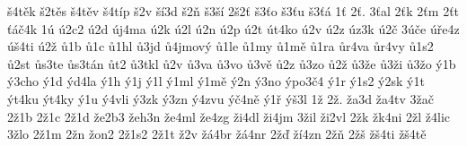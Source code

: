 {\v s4t\v ek
\v s2t\v es
\v s4t\v ev
\v s4t\'ip
\v s2v
\v s\'i3d
\v s2\v n
\v s3\v s\'i
2\v s2\v t
\v s3\v to
\v s3\v tu
\v s3\v t\'a
1\v t
2\v t.
3\v tal
2\v tk
2\v tm
2\v tt
\v t\'a\v c4k
1\'u
\'u2c2
\'u2d
\'uj4ma
\'u2k
\'u2l
\'u2n
\'u2p
\'u2t
\'ut4ko
\'u2v
\'u2z
\'uz3k
\'u2\v c
3\'u\v ce
\'u\v re4z
\'u\v s4ti
\'u2\v z
\r u1b
\r u1c
\r u1hl
\r u3jd
\r u4jmov\'y
\r u1le
\r u1my
\r u1m\v e
\r u1ra
\r ur4va
\r ur4vy
\r u1s2
\r u2st
\r us3te
\r us3t\'an
\r ut2
\r u3tkl
\r u2v
\r u3va
\r u3vo
\r u3v\v e
\r u2z
\r u3zo
\r u2\v z
\r u3\v ze
\r u3\v zi
\r u3\v zo
\'y1b
\'y3cho
\'y1d
\'yd4la
\'y1h
\'y1j
\'y1l
\'y1ml
\'y1m\v e
\'y2n
\'y3no
\'ypo3\v c4
\'y1r
\'y1s2
\'y2sk
\'y1t
\'yt4ku
\'yt4ky
\'y1u
\'y4vli
\'y3zk
\'y3zn
\'y4zvu
\'y\v c4n\v e
\'y1\v r
\'y\v s3l
1\v z
2\v z.
\v za3d
\v za4tv
3\v za\v c
2\v z1b
2\v z1c
2\v z1d
\v ze2b3
\v zeh3n
\v ze4ml
\v ze4zg
\v zi4dl
\v zi4jm
3\v zil
\v zi2vl
2\v zk
\v zk4ni
2\v zl
\v z4lic
3\v zlo
2\v z1m
2\v zn
\v zon2
2\v z1s2
2\v z1t
\v z2v
\v z\'a4br
\v z\'a4nr
2\v z\v d
\v z\'i4zn
2\v z\v n
2\v z\v s
\v z\v s4ti
\v z\v s4t\v e
}
\endinput
